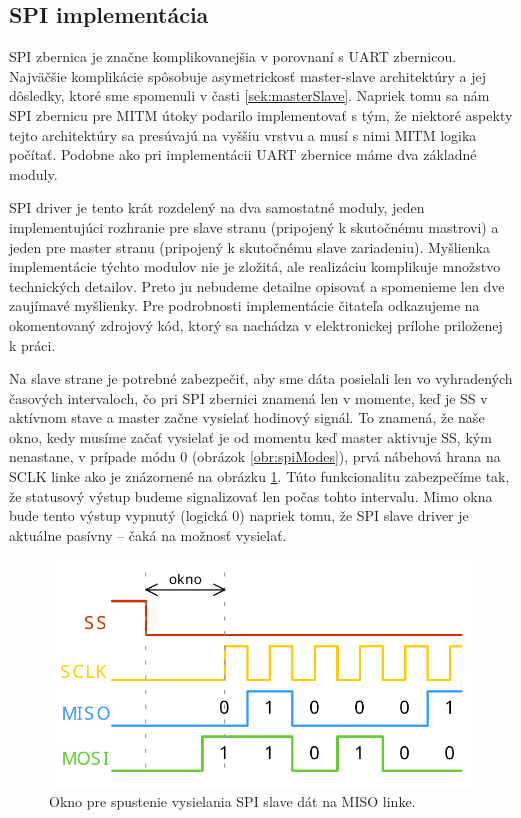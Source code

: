 \subsection{SPI implementácia} \label{sek:spiImplementation}
SPI zbernica je značne komplikovanejšia v porovnaní s UART zbernicou. Najväčšie komplikácie spôsobuje asymetrickosť master-slave architektúry a jej dôsledky, ktoré sme spomenuli v časti \ref{sek:masterSlave}. Napriek tomu sa nám SPI zbernicu pre MITM útoky podarilo implementovať s tým, že niektoré aspekty tejto architektúry sa presúvajú na vyššiu vrstvu a musí s nimi MITM logika počítať. Podobne ako pri implementácii UART zbernice máme dva základné moduly.

SPI driver je tento krát rozdelený na dva samostatné moduly, jeden implementujúci rozhranie pre slave stranu (pripojený k skutočnému mastrovi) a jeden pre master stranu (pripojený k skutočnému slave zariadeniu). Myšlienka implementácie týchto modulov nie je zložitá, ale realizáciu komplikuje množstvo technických detailov. Preto ju nebudeme detailne opisovať a spomenieme len dve zaujímavé myšlienky. Pre podrobnosti implementácie čitateľa odkazujeme na okomentovaný zdrojový kód, ktorý sa nachádza v elektronickej prílohe priloženej k práci.

Na slave strane je potrebné zabezpečiť, aby sme dáta posielali len vo vyhradených časových intervaloch, čo pri SPI zbernici znamená len v momente, keď je SS v aktívnom stave a master začne vysielať hodinový signál. To znamená, že naše okno, kedy musíme začať vysielať je od momentu keď master aktivuje SS, kým nenastane, v prípade módu 0 (obrázok \ref{obr:spiModes}), prvá  nábehová hrana na SCLK linke ako je znázornené na obrázku \ref{obr:spiSlaveWindow}. Túto funkcionalitu zabezpečíme tak, že statusový výstup  budeme signalizovať len počas tohto intervalu. Mimo okna bude tento výstup vypnutý (logická 0) napriek tomu, že SPI slave driver je aktuálne pasívny -- čaká na možnosť vysielať.

\begin{figure}
    \centerline{\includegraphics[width=1\textwidth]{images/signals/spiSlaveWindow.pdf}}
    \caption[Okno pre spustenie vysielania SPI slave dát]{Okno pre spustenie vysielania SPI slave dát na MISO linke.}
    \label{obr:spiSlaveWindow}
\end{figure}

